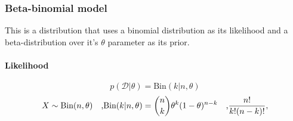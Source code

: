 \documentclass[../main.tex]{subfiles}
\begin{document}
    \subsubsection{Beta-binomial model} 
        This is a distribution that uses a binomial distribution as its likelihood and a beta-distribution over it's $\theta$ parameter as its prior. 
        \paragraph{Likelihood}
            $$p(\mathcal{D}|\theta) = \text{Bin}(k|n, \theta )$$
        $$X \sim \text{Bin}(n, \theta ) \text{\hspace{1em},Bin}(k|n,\theta)={n \choose k} \theta^k (1-\theta)^{n-k} \text{\hspace{1em},}\frac{n!}{k!(n-k)!},$$ 
\end{document}
